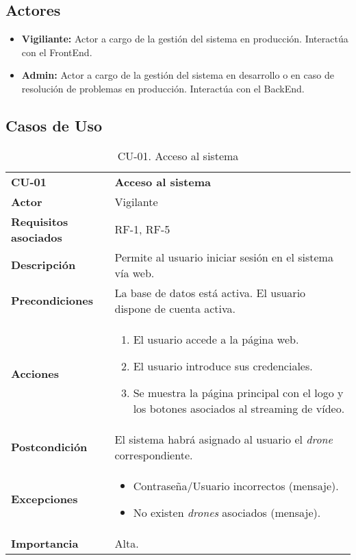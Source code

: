 \subsection{Actores}

\begin{itemize}
\item \textbf{Vigiliante:} Actor a cargo de la gestión del sistema en producción. Interactúa con el FrontEnd.
\item \textbf{Admin:} Actor a cargo de la gestión del sistema en desarrollo o en caso de resolución de problemas en producción. Interactúa con el BackEnd.
\end{itemize}

\subsection{Casos de Uso}

\begin{table}[H]
	\begin{center}
		\begin{tabular}{m{3cm} | m{10cm}}\hline
			\toprule
			\textbf{CU-01} & \textbf{Acceso al sistema}\\
			\otoprule
			\textbf{Actor} & Vigilante\\
			\textbf{Requisitos asociados} & RF-1, RF-5\\
			\textbf{Descripción} & Permite al usuario iniciar sesión en el sistema vía web.\\
			\textbf{Precondiciones} & La base de datos está activa. El usuario dispone de cuenta activa.\\
			\textbf{Acciones} & \begin{enumerate}
											\item El usuario accede a la página web.
											\item El usuario introduce sus credenciales.
											\item Se muestra la página principal con el logo y los botones asociados al streaming de vídeo.
											\end{enumerate}\\
			
			\textbf{Postcondición} & El sistema habrá asignado al usuario el \emph{drone} correspondiente. \\
			\textbf{Excepciones} & \begin{itemize}
												\item Contraseña/Usuario incorrectos (mensaje).
												\item No existen \emph{drones} asociados (mensaje).
												\end{itemize}\\
			\textbf{Importancia} & Alta.\\
			\hline
			\bottomrule
		\end{tabular}
		\caption{CU-01. Acceso al sistema}
		\label{tb:CU01}
	\end{center}
\end{table}



